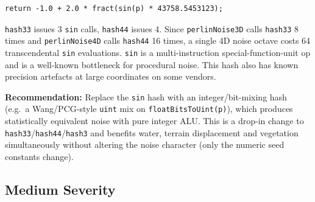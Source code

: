 \documentclass[a4paper,12pt]{article}
\begin{document}
\begin{enumerate}[leftmargin=*]
\begin{lstlisting}
return -1.0 + 2.0 * fract(sin(p) * 43758.5453123);
\end{lstlisting}

  \texttt{hash33} issues 3 \texttt{sin} calls, \texttt{hash44} issues 4. Since
  \texttt{perlinNoise3D} calls \texttt{hash33} 8 times and
  \texttt{perlinNoise4D} calls \texttt{hash44} 16 times, a single 4D noise
  octave costs 64 transcendental \texttt{sin} evaluations. \texttt{sin} is a
  multi-instruction special-function-unit op and is a well-known bottleneck for
  procedural noise. This hash also has known precision artefacts at large
  coordinates on some vendors.

  \textbf{Recommendation:}
  Replace the \texttt{sin} hash with an integer/bit-mixing hash (e.g.\ a
  Wang/PCG-style \texttt{uint} mix on \texttt{floatBitsToUint(p)}), which
  produces statistically equivalent noise with pure integer ALU. This is a
  drop-in change to \texttt{hash33}/\texttt{hash44}/\texttt{hash3} and benefits
  water, terrain displacement and vegetation simultaneously without altering the
  noise character (only the numeric seed constants change).

\end{enumerate}

\newpage

\subsection{Medium Severity}
\end{document}
